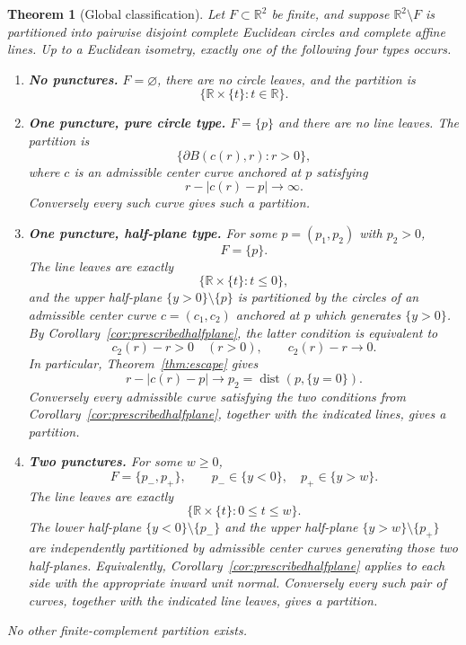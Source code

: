 \documentclass[11pt]{article}
\newtheorem{theorem}{Theorem}[section]
\newcommand{\R}{\mathbb{R}}
\DeclareMathOperator{\dist}{dist}
\begin{document}
\begin{theorem}[Global classification]\label{thm:global}
Let $F\subset\R^2$ be finite, and suppose $\R^2\setminus F$ is partitioned into pairwise disjoint complete Euclidean circles and complete affine lines. Up to a Euclidean isometry, exactly one of the following four types occurs.

\begin{enumerate}[label=\textup{(\Roman*)},leftmargin=2.4em]
\item \textbf{No punctures.} $F=\varnothing$, there are no circle leaves, and the partition is
\[
\{\R\times\{t\}:t\in\R\}.
\]

\item \textbf{One puncture, pure circle type.} $F=\{p\}$ and there are no line leaves. The partition is
\[
\{\partial B(c(r),r):r>0\},
\]
where $c$ is an admissible center curve anchored at $p$ satisfying
\[
r-|c(r)-p|\longrightarrow\infty.
\]
Conversely every such curve gives such a partition.

\item \textbf{One puncture, half-plane type.} For some $p=(p_1,p_2)$ with $p_2>0$,
\[
F=\{p\}.
\]
The line leaves are exactly
\[
\{\R\times\{t\}:t\le0\},
\]
and the upper half-plane $\{y>0\}\setminus\{p\}$ is partitioned by the circles of an admissible center curve $c=(c_1,c_2)$ anchored at $p$ which generates $\{y>0\}$. By Corollary~\ref{cor:prescribedhalfplane}, the latter condition is equivalent to
\[
c_2(r)-r>0\quad(r>0),
\qquad
c_2(r)-r\longrightarrow0.
\]
In particular, Theorem~\ref{thm:escape} gives
\[
r-|c(r)-p|\longrightarrow p_2=\dist(p,\{y=0\}).
\]
Conversely every admissible curve satisfying the two conditions from Corollary~\ref{cor:prescribedhalfplane}, together with the indicated lines, gives a partition.

\item \textbf{Two punctures.} For some $w\ge0$,
\[
F=\{p_-,p_+\},
\qquad
p_-\in\{y<0\},
\quad
p_+\in\{y>w\}.
\]
The line leaves are exactly
\[
\{\R\times\{t\}:0\le t\le w\}.
\]
The lower half-plane $\{y<0\}\setminus\{p_-\}$ and the upper half-plane $\{y>w\}\setminus\{p_+\}$ are independently partitioned by admissible center curves generating those two half-planes. Equivalently, Corollary~\ref{cor:prescribedhalfplane} applies to each side with the appropriate inward unit normal. Conversely every such pair of curves, together with the indicated line leaves, gives a partition.
\end{enumerate}

No other finite-complement partition exists.
\end{theorem}
\end{document}
